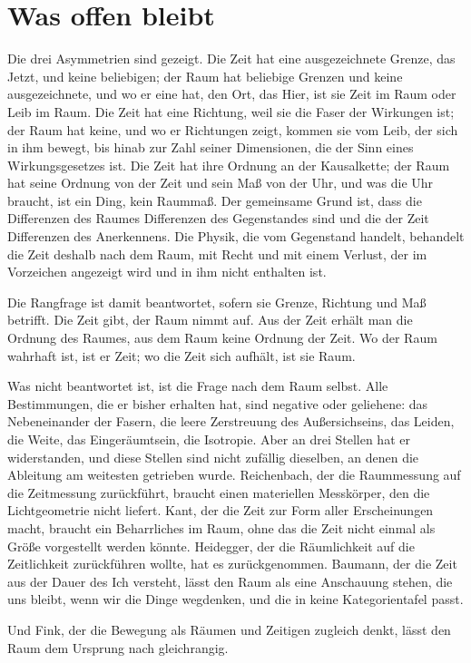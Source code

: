 \chapter{Was offen bleibt}

Die drei Asymmetrien sind gezeigt. Die Zeit hat eine ausgezeichnete Grenze, das Jetzt, und keine beliebigen; der Raum hat beliebige Grenzen und keine ausgezeichnete, und wo er eine hat, den Ort, das Hier, ist sie Zeit im Raum oder Leib im Raum. Die Zeit hat eine Richtung, weil sie die Faser der Wirkungen ist; der Raum hat keine, und wo er Richtungen zeigt, kommen sie vom Leib, der sich in ihm bewegt, bis hinab zur Zahl seiner Dimensionen, die der Sinn eines Wirkungsgesetzes ist. Die Zeit hat ihre Ordnung an der Kausalkette; der Raum hat seine Ordnung von der Zeit und sein Maß von der Uhr, und was die Uhr braucht, ist ein Ding, kein Raummaß. Der gemeinsame Grund ist, dass die Differenzen des Raumes Differenzen des Gegenstandes sind und die der Zeit Differenzen des Anerkennens. Die Physik, die vom Gegenstand handelt, behandelt die Zeit deshalb nach dem Raum, mit Recht und mit einem Verlust, der im Vorzeichen angezeigt wird und in ihm nicht enthalten ist.

Die Rangfrage ist damit beantwortet, sofern sie Grenze, Richtung und Maß betrifft. Die Zeit gibt, der Raum nimmt auf. Aus der Zeit erhält man die Ordnung des Raumes, aus dem Raum keine Ordnung der Zeit. Wo der Raum wahrhaft ist, ist er Zeit; wo die Zeit sich aufhält, ist sie Raum.

Was nicht beantwortet ist, ist die Frage nach dem Raum selbst. Alle Bestimmungen, die er bisher erhalten hat, sind negative oder geliehene: das Nebeneinander der Fasern, die leere Zerstreuung des Außersichseins, das Leiden, die Weite, das Eingeräumtsein, die Isotropie. Aber an drei Stellen hat er widerstanden, und diese Stellen sind nicht zufällig dieselben, an denen die Ableitung am weitesten getrieben wurde. Reichenbach, der die Raummessung auf die Zeitmessung zurückführt, braucht einen materiellen Messkörper, den die Lichtgeometrie nicht liefert. Kant, der die Zeit zur Form aller Erscheinungen macht, braucht ein Beharrliches im Raum, ohne das die Zeit nicht einmal als Größe vorgestellt werden könnte. Heidegger, der die Räumlichkeit auf die Zeitlichkeit zurückführen wollte, hat es zurückgenommen. Baumann, der die Zeit aus der Dauer des Ich versteht, lässt den Raum als eine Anschauung stehen, die uns bleibt, wenn wir die Dinge wegdenken, und die in keine Kategorientafel passt.

Und Fink, der die Bewegung als Räumen und Zeitigen zugleich denkt, lässt den Raum dem Ursprung nach gleichrangig.

